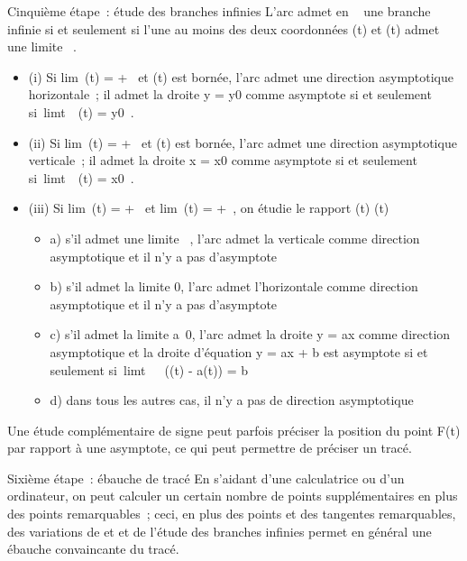 Cinquième étape~: étude des branches infinies L'arc admet en \alpha~
\in\overlineD une branche infinie si et seulement si
l'une au moins des deux coordonnées \phi(t) et \psi(t) admet une limite \infty~.

\begin{itemize}
\itemsep1pt\parskip0pt
\item
  (i) Si lim~\textbar{}\phi(t)\textbar{} = +\infty~ et
  \psi(t) est bornée, l'arc admet une direction asymptotique horizontale~;
  il admet la droite y = y0 comme asymptote si et seulement
  si~limt\rightarrow~\alpha~\psi(t) = y0~.
\item
  (ii) Si lim~\textbar{}\psi(t)\textbar{} = +\infty~ et
  \phi(t) est bornée, l'arc admet une direction asymptotique verticale~; il
  admet la droite x = x0 comme asymptote si et seulement
  si~limt\rightarrow~\alpha~\phi(t) = x0~.
\item
  (iii) Si lim~\textbar{}\phi(t)\textbar{} = +\infty~ et
  lim~\textbar{}\psi(t)\textbar{} = +\infty~, on étudie
  le rapport  \psi(t) \over \phi(t)

  \begin{itemize}
  \itemsep1pt\parskip0pt
  \item
    a) s'il admet une limite \infty~, l'arc admet la verticale comme direction
    asymptotique et il n'y a pas d'asymptote
  \item
    b) s'il admet la limite 0, l'arc admet l'horizontale comme direction
    asymptotique et il n'y a pas d'asymptote
  \item
    c) s'il admet la limite a\neq~0, l'arc admet
    la droite y = ax comme direction asymptotique et la droite
    d'équation y = ax + b est asymptote si et seulement
    si~limt\rightarrow~\alpha~~(\psi(t) - a\phi(t)) = b
  \item
    d) dans tous les autres cas, il n'y a pas de direction asymptotique
  \end{itemize}
\end{itemize}

Une étude complémentaire de signe peut parfois préciser la position du
point F(t) par rapport à une asymptote, ce qui peut permettre de
préciser un tracé.

Sixième étape~: ébauche de tracé En s'aidant d'une calculatrice ou d'un
ordinateur, on peut calculer un certain nombre de points supplémentaires
en plus des points remarquables~; ceci, en plus des points et des
tangentes remarquables, des variations de \phi et \psi et de l'étude des
branches infinies permet en général une ébauche convaincante du tracé.

